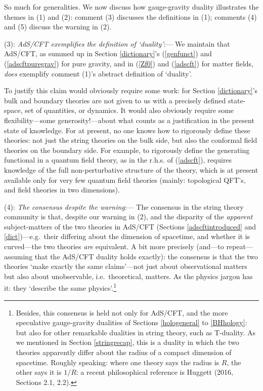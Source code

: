 \documentclass[12pt]{article}
\renewcommand{\^}[1]{\hat{#1}}
\newcommand{\eq}[1]{(\ref{#1})}
\begin{document}
So much for generalities. We now discuss how gauge-gravity duality illustrates the themes in (1) and (2): comment (3) discusses the definitions in (1); comments (4) and (5) discuss the warning in (2).

(3): {\em AdS/CFT exemplifies the definition of `duality'}:--- We maintain that AdS/CFT, as summed up in Section \ref{dictionary}'s \eq{genfunct} and \eq{adscftpuregrav} for pure gravity, and in \eq{Zf0} and \eq{adscft} for matter fields, {\em does} exemplify comment (1)'s abstract definition of `duality'. 

To justify this claim would obviously require some work: for Section \ref{dictionary}'s bulk and boundary theories are not given to us with a precisely defined state-space, set of quantities, or dynamics. It would also obviously require some flexibility---some generosity!---about what counts as a justification in the present state of knowledge. For at present, no one knows how to rigorously define these theories: not just the string theories on the bulk side, but also the conformal field theories on the boundary side. For example, to rigorously define the generating functional in a quantum field theory, as in the r.h.s. of \eq{adscft},  requires knowledge of the full non-perturbative structure of the theory, which is at present available only for very few quantum field theories (mainly: topological QFT's, and field theories in two dimensions). 

(4): {\em The consensus despite the warning}:--- The consensus in the string theory community is that, despite our warning in (2), and the disparity of the {\em apparent} subject-matters of the two theories in AdS/CFT (Sections \ref{adscftintroduced} and \ref{dict})---e.g.~their differing about the dimension of spacetime, and whether it is curved---the two theories {\em are} equivalent. A bit more precisely (and---to repeat---assuming that the AdS/CFT duality holds exactly): the consensus  is that the two theories `make exactly the same claims'---not just about observational matters but also about unobservable, i.e.~theoretical, matters. As the physics jargon has it: they `describe the same physics'.\footnote{Besides, this consensus is held not only for AdS/CFT, and the more speculative gauge-gravity dualities of Sections \ref{hologeneral} to \ref{BHhology}: but also for other remarkable dualities in string theory, such as T-duality. As we mentioned in Section \ref{stringrecap}, this is a duality in which the two theories apparently differ about the radius of a compact dimension of spacetime. Roughly speaking: where one theory says the radius is $R$, the other says it is $1/R$: a recent philosophical reference is Huggett (2016, Sections 2.1, 2.2).}
\end{document}
